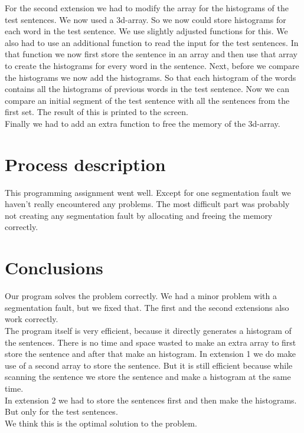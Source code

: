 \documentclass[a4paper]{article}
\begin{document}
For the second extension we had to modify the array for the histograms of the test sentences. We now used a 3d-array. So we now could store histograms for each word in the test sentence. We use slightly adjusted functions for this. We also had to use an additional function to read the input for the test sentences. In that function we now first store the sentence in an array and then use that array to create the histograms for every word in the sentence. Next, before we compare the histograms we now add the histograms. So that each histogram of the words contains all the histograms of previous words in the test sentence. 
Now we can compare an initial segment of the test sentence with all the sentences from the first set.
The result of this is printed to the screen.\\
Finally we had to add an extra function to free the memory of the 3d-array.

\section{Process description}

This programming assignment went well. Except for one segmentation fault we haven't really encountered any problems. The most difficult part was probably not creating any segmentation fault by allocating and freeing the memory correctly.

\section{Conclusions}

Our program solves the problem correctly. We had a minor problem with a segmentation fault, but we fixed that. The first and the second extensions also work correctly.\\
The program itself is very efficient, because it directly generates a histogram of the sentences. There is no time and space wasted to make an extra array to first store the sentence and after that make an histogram.
In extension 1 we do make use of a second array to store the sentence. But it is still efficient because while scanning the sentence we store the sentence and make a histogram at the same time.\\
In extension 2 we had to store the sentences first and then make the histograms. But only for the test sentences.
\\
We think this is the optimal solution to the problem.\\
\end{document}
